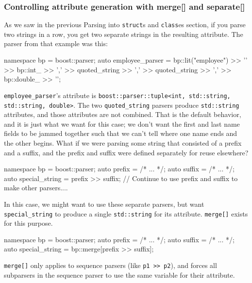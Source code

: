 \hfill\break

\subsubsection{Controlling attribute generation with merge{[}{]} and separate{[}{]}}

As we saw in the previous Parsing into \texttt{struct}s and \texttt{class}es section, if you parse two strings in a row, you get two separate strings in the resulting attribute. The parser from that example was this:

\begin{code}
namespace bp = boost::parser;
auto employee_parser = bp::lit("employee")
    >> '{'
    >> bp::int_ >> ','
    >> quoted_string >> ','
    >> quoted_string >> ','
    >> bp::double_
    >> '}';
\end{code}

\texttt{employee\_parser}'s attribute is \texttt{boost::parser::tuple<int, std::string, std::string, double>}. The two \texttt{quoted\_string} parsers produce \texttt{std::string} attributes, and those attributes are not combined. That is the default behavior, and it is just what we want for this case; we don't want the first and last name fields to be jammed together such that we can't tell where one name ends and the other begins. What if we were parsing some string that consisted of a prefix and a suffix, and the prefix and suffix were defined separately for reuse elsewhere?

\begin{code}
namespace bp = boost::parser;
auto prefix = /* ... */;
auto suffix = /* ... */;
auto special_string = prefix >> suffix;
// Continue to use prefix and suffix to make other parsers....
\end{code}

In this case, we might want to use these separate parsers, but want \texttt{special\_string} to produce a single \texttt{std::string} for its attribute. \texttt{merge{[}{]}} exists for this purpose.

\begin{code}
namespace bp = boost::parser;
auto prefix = /* ... */;
auto suffix = /* ... */;
auto special_string = bp::merge[prefix >> suffix];
\end{code}

\texttt{merge{[}{]}} only applies to sequence parsers (like \texttt{p1 >> p2}), and forces all subparsers in the sequence parser to use the same variable for their attribute.

